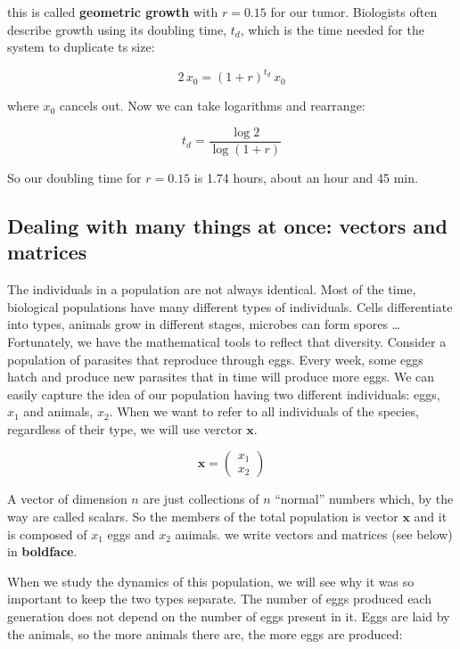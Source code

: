 \documentclass[12pt]{article}
\begin{document}
this is called \textbf{geometric growth} with $r=0.15$ for our tumor. Biologists often describe growth using its doubling time, $t_d$,  which is the time needed for the system to duplicate ts size:

\begin{equation}
2\, x_{0} = (1 + r)^{t_d} \, x_0
\end{equation}

where $x_0$ cancels out. Now we can take  logarithms and rearrange:

\begin{equation}
t_d = \frac{\log 2}{\log (1 + r) }
\end{equation}

So our doubling time for $r=0.15$ is 1.74 hours, about an hour and 45 min.

\subsection{Dealing with many things at once: vectors and matrices}

The  individuals in a population are not always identical. Most of the time, biological populations have many different types of individuals. Cells differentiate into types, animals grow in different stages, microbes can form spores \dots Fortunately, we have the mathematical tools to reflect that diversity. Consider a population of parasites that reproduce through eggs. Every week, some eggs hatch and produce new parasites that in time will produce more eggs. We can easily capture the idea of our population having two different individuals: eggs, $x_1$ and animals, $x_2$. When we want to refer to all individuals of the species, regardless of their type, we will use verctor $\mathbf{x}$.

\begin{equation}
\mathbf{x} =\left( \begin{array}{c} x_1 \\  x_2 \end{array} \right)
\end{equation}

A vector of dimension $n$ are just collections of $n$ ``normal'' numbers which, by the way are called scalars. So the members of the total population is vector  $\mathbf{x}$ and it is composed of $x_1$ eggs and $x_2$ animals. we write vectors and matrices (see below) in \textbf{boldface}.


When we study the dynamics of this population, we will see why it was so important to keep the two types separate. The number of eggs produced each generation does not depend on the number of eggs present in it. Eggs are laid by the animals, so the more animals there are, the more eggs are produced:
\end{document}
